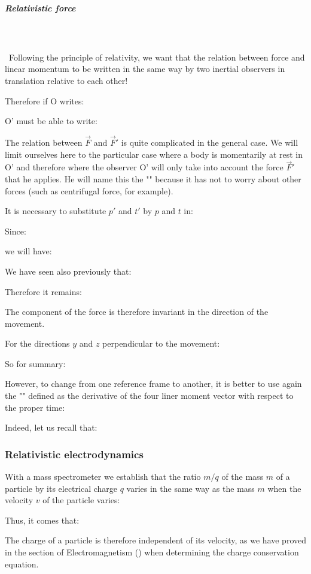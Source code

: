 	\subparagraph{Relativistic force}\mbox{}\\\\\
	Following the principle of relativity, we want that the relation between force and linear momentum to be written in the same way by two inertial observers in translation relative to each other!

	Therefore if O writes:
	
	O' must be able to write:
	
	The relation between $\vec{F}$ and $\vec{F}'$ is quite complicated in the general case. We will limit ourselves here to the particular case where a body is momentarily at rest in O' and therefore where the observer O' will only take into account the force $\vec{F}'$ that he applies. He will name this the "" because it has not to worry about other forces (such as centrifugal force, for example).

	It is necessary to substitute $p'$ and $t'$ by $p$ and $t$ in:
	
	Since:
	
	we will have:
	
	We have seen also previously that:
	
	Therefore it remains:
	
	The component of the force is therefore invariant in the direction of the movement.

	For the directions $y$ and $z$ perpendicular to the movement:
	
	So for summary:
	
	However, to change from one reference frame to another, it is better to use again the "" defined as the derivative of the four liner moment vector with respect to the proper time:
	
	Indeed, let us recall that:
	
	
	\pagebreak
	\subsubsection{Relativistic electrodynamics}\label{relativistic electrodynamics}
	With a mass spectrometer we establish that the ratio $m / q$ of the mass $m$ of a particle by its electrical charge $q$ varies in the same way as the mass $m$ when the velocity $v$ of the particle varies:
	
	Thus, it comes that:
	
	The charge of a particle is therefore independent of its velocity, as we have proved in the section of Electromagnetism () when determining the charge conservation equation.

